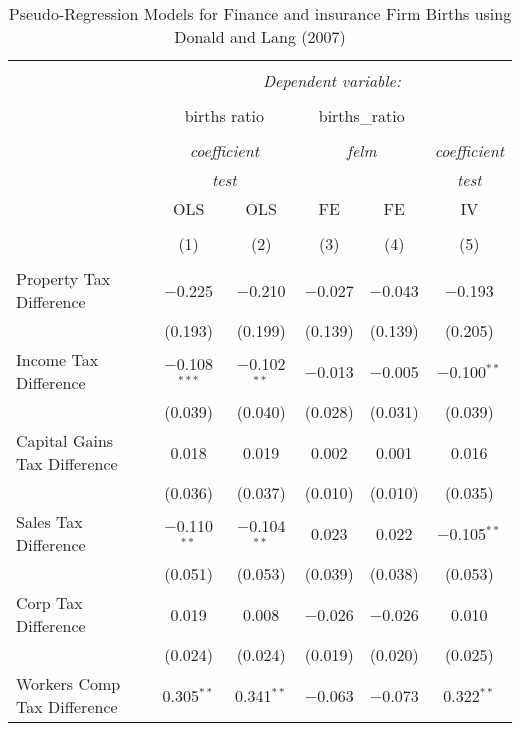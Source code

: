 
\begin{table}[!htbp] \centering 
  \caption{Pseudo-Regression Models for  Finance and insurance Firm Births using Donald and Lang (2007)} 
  \label{} 
\begin{tabular}{@{\extracolsep{5pt}}lccccc} 
\\[-1.8ex]\hline 
\hline \\[-1.8ex] 
 & \multicolumn{5}{c}{\textit{Dependent variable:}} \\ 
\cline{2-6} 
\\[-1.8ex] & \multicolumn{2}{c}{births ratio} & \multicolumn{2}{c}{births\_ratio} &   \\ 
\\[-1.8ex] & \multicolumn{2}{c}{\textit{coefficient}} & \multicolumn{2}{c}{\textit{felm}} & \textit{coefficient} \\ 
 & \multicolumn{2}{c}{\textit{test}} & \multicolumn{2}{c}{\textit{}} & \textit{test} \\ 
 & OLS & OLS & FE & FE & IV \\ 
\\[-1.8ex] & (1) & (2) & (3) & (4) & (5)\\ 
\hline \\[-1.8ex] 
 Property Tax Difference & $-$0.225 & $-$0.210 & $-$0.027 & $-$0.043 & $-$0.193 \\ 
  & (0.193) & (0.199) & (0.139) & (0.139) & (0.205) \\ 
  Income Tax Difference & $-$0.108$^{***}$ & $-$0.102$^{**}$ & $-$0.013 & $-$0.005 & $-$0.100$^{**}$ \\ 
  & (0.039) & (0.040) & (0.028) & (0.031) & (0.039) \\ 
  Capital Gains Tax Difference & 0.018 & 0.019 & 0.002 & 0.001 & 0.016 \\ 
  & (0.036) & (0.037) & (0.010) & (0.010) & (0.035) \\ 
  Sales Tax Difference & $-$0.110$^{**}$ & $-$0.104$^{**}$ & 0.023 & 0.022 & $-$0.105$^{**}$ \\ 
  & (0.051) & (0.053) & (0.039) & (0.038) & (0.053) \\ 
  Corp Tax Difference & 0.019 & 0.008 & $-$0.026 & $-$0.026 & 0.010 \\ 
  & (0.024) & (0.024) & (0.019) & (0.020) & (0.025) \\ 
  Workers Comp Tax Difference & 0.305$^{**}$ & 0.341$^{**}$ & $-$0.063 & $-$0.073 & 0.322$^{**}$ \\ 

\end{tabular}
\end{table}
